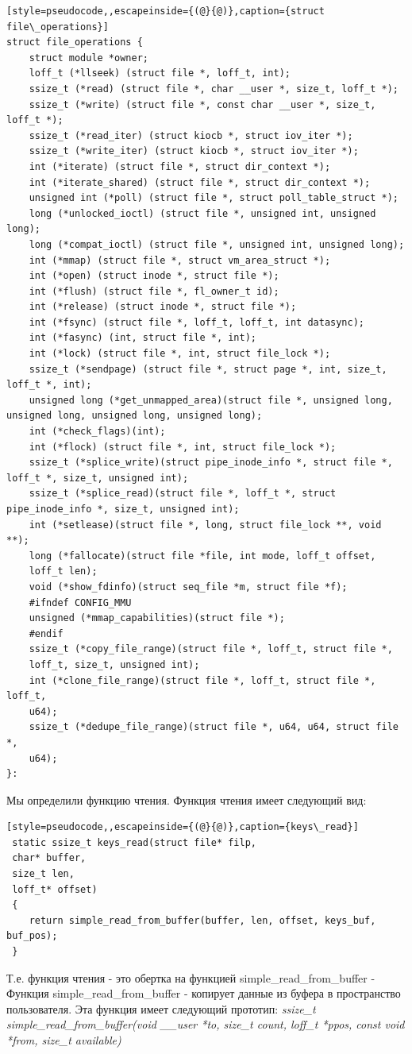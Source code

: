  \begin{lstlisting}[style=pseudocode,,escapeinside={(@}{@)},caption={struct file\_operations}] 
struct file_operations {
	struct module *owner;
	loff_t (*llseek) (struct file *, loff_t, int);
	ssize_t (*read) (struct file *, char __user *, size_t, loff_t *);
	ssize_t (*write) (struct file *, const char __user *, size_t, loff_t *);
	ssize_t (*read_iter) (struct kiocb *, struct iov_iter *);
	ssize_t (*write_iter) (struct kiocb *, struct iov_iter *);
	int (*iterate) (struct file *, struct dir_context *);
	int (*iterate_shared) (struct file *, struct dir_context *);
	unsigned int (*poll) (struct file *, struct poll_table_struct *);
	long (*unlocked_ioctl) (struct file *, unsigned int, unsigned long);
	long (*compat_ioctl) (struct file *, unsigned int, unsigned long);
	int (*mmap) (struct file *, struct vm_area_struct *);
	int (*open) (struct inode *, struct file *);
	int (*flush) (struct file *, fl_owner_t id);
	int (*release) (struct inode *, struct file *);
	int (*fsync) (struct file *, loff_t, loff_t, int datasync);
	int (*fasync) (int, struct file *, int);
	int (*lock) (struct file *, int, struct file_lock *);
	ssize_t (*sendpage) (struct file *, struct page *, int, size_t, loff_t *, int);
	unsigned long (*get_unmapped_area)(struct file *, unsigned long, unsigned long, unsigned long, unsigned long);
	int (*check_flags)(int);
	int (*flock) (struct file *, int, struct file_lock *);
	ssize_t (*splice_write)(struct pipe_inode_info *, struct file *, loff_t *, size_t, unsigned int);
	ssize_t (*splice_read)(struct file *, loff_t *, struct pipe_inode_info *, size_t, unsigned int);
	int (*setlease)(struct file *, long, struct file_lock **, void **);
	long (*fallocate)(struct file *file, int mode, loff_t offset,
	loff_t len);
	void (*show_fdinfo)(struct seq_file *m, struct file *f);
	#ifndef CONFIG_MMU
	unsigned (*mmap_capabilities)(struct file *);
	#endif
	ssize_t (*copy_file_range)(struct file *, loff_t, struct file *,
	loff_t, size_t, unsigned int);
	int (*clone_file_range)(struct file *, loff_t, struct file *, loff_t,
	u64);
	ssize_t (*dedupe_file_range)(struct file *, u64, u64, struct file *,
	u64);
}:
 \end{lstlisting}
 Мы определили функцию чтения. Функция чтения имеет следующий вид:\\
  \begin{lstlisting}[style=pseudocode,,escapeinside={(@}{@)},caption={keys\_read}] 
 static ssize_t keys_read(struct file* filp,
 char* buffer,
 size_t len,
 loff_t* offset)
 {
 	return simple_read_from_buffer(buffer, len, offset, keys_buf, buf_pos);
 }
  \end{lstlisting}
  Т.е. функция чтения - это обертка на функцией simple\_read\_from\_buffer - Функция simple\_read\_from\_buffer - копирует данные из буфера в пространство пользователя.
  Эта функция имеет следующий прототип: \textit{ssize\_t simple\_read\_from\_buffer(void \_\_user *to, size\_t count, loff\_t *ppos,
  const void *from, size\_t available)} 

